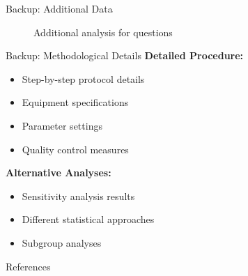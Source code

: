\documentclass[aspectratio=169,11pt]{beamer}
\begin{document}

\appendix

\begin{frame}{Backup: Additional Data}
  \begin{figure}
    \centering
    \caption{Additional analysis for questions}
  \end{figure}
\end{frame}

\begin{frame}{Backup: Methodological Details}
  \textbf{Detailed Procedure:}
  \begin{itemize}
    \item Step-by-step protocol details
    \item Equipment specifications
    \item Parameter settings
    \item Quality control measures
  \end{itemize}

  \vspace{0.5cm}

  \textbf{Alternative Analyses:}
  \begin{itemize}
    \item Sensitivity analysis results
    \item Different statistical approaches
    \item Subgroup analyses
  \end{itemize}
\end{frame}


\begin{frame}[allowframebreaks]{References}
  \printbibliography
\end{frame}
\end{document}
